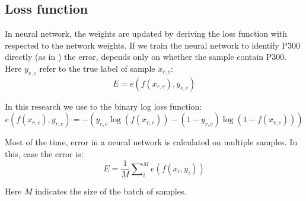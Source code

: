 \documentclass[
12pt, %
english, %
doublespacing, %
headsepline, %
]{MastersDoctoralThesis} %
\begin{document}
\subsection{Loss function}
In neural network, the weights are updated by deriving the loss function with respected to the network weights. If we train the neural network to identify P300 directly (as in \cite{P300_CNN}) the error, depends only on whether the sample contain P300. Here $y_{r,c}$ refer to the true label of sample $x_{r,c}$:
\begin{equation}
E = e\left( {f\left( {{x_{r,c}}} \right),{y_{r,c}}} \right)
\end{equation} 

In this research we use to the binary log loss function:
\begin{equation}\label{eq:binary_log_loss}
e\left( {f\left( {{x_{r,c}}} \right),{y_{r,c}}} \right) =  - \left( {{y_{r,c}}\log \left( {f\left( {{x_{r,c}}} \right)} \right) - \left( {1 - {y_{r,c}}} \right)\log \left( {1 - f\left( {{x_{r,c}}} \right)} \right)} \right)
\end{equation} 


Most of the time, error in a neural network is calculated on multiple samples. In this, case the error is:
\begin{equation}\label{eq:mini_batch_loss}
E = \frac{1}{M}\sum\nolimits_i^M {e\left( {f\left( {{x_i},{y_i}} \right)} \right)}
\end{equation}

Here $M$ indicates the size of the batch of samples.
\end{document}
